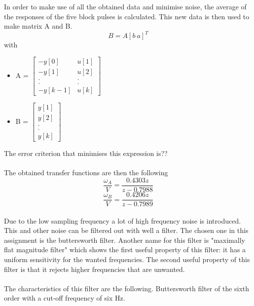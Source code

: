 In order to make use of all the obtained data and minimise noise, the average of the responses of the five block pulses is calculated. This new data is then used to make matrix A and B. 
\begin{equation}
    B = A[b\:a]^T
\end{equation}
with
\begin{itemize}

    \item A = 
        $\begin{bmatrix}
            - y[0] & u[1] \\
            - y[1] & u[2] \\
            . & .\\
            . & .\\
            - y[k-1] & u[k]
        \end{bmatrix}$
    \item B = 
        $\begin{bmatrix}
            y[1] \\
            y[2] \\
            . \\
            . \\
            y[k]
        \end{bmatrix}$

\end{itemize}
The error criterion that minimises this expression is??\\
\\
The obtained transfer functions are then the following\\
\begin{equation}
    \frac{\omega_{A}}{V} = \frac{0.4303z}{z-0.7988}  
\end{equation}
\begin{equation}
    \frac{\omega_{B}}{V} = \frac{0.4206z}{z-0.7989}
\end{equation}
\\
Due to the low sampling frequency a lot of high frequency noise is introduced. This and other noise can be filtered out with well a filter. The chosen one in this assignment is the buttersworth filter. Another name for this filter is "maximally flat magnitude filter" which shows the first useful property of this filter: it has a uniform sensitivity for the wanted frequencies. The second useful property of this filter is that it rejects higher frequencies that are unwanted.\\
\\
The characteristics of this filter are the following. Buttersworth filter of the sixth order with a cut-off frequency of six Hz.\\
